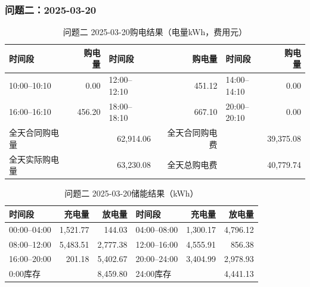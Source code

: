 \par\noindent\begin{minipage}{\textwidth}
\subsubsection*{问题二：2025-03-20}
\begin{table}[H]\centering\small\setlength{\tabcolsep}{4pt}\caption{问题二 2025-03-20购电结果（电量kWh，费用元）}
\begin{tabular}{lr lr lr}\toprule
时间段 & 购电量 & 时间段 & 购电量 & 时间段 & 购电量\\\midrule
10:00--10:10 & 0.00 & 12:00--12:10 & 451.12 & 14:00--14:10 & 0.00\\
16:00--16:10 & 456.20 & 18:00--18:10 & 667.10 & 20:00--20:10 & 0.00\\
\midrule
全天合同购电量 & \multicolumn{2}{r}{62,914.06} & 全天合同购电费 & \multicolumn{2}{r}{39,375.08}\\
全天实际购电量 & \multicolumn{2}{r}{63,230.08} & 全天总购电费 & \multicolumn{2}{r}{40,779.74}\\
\bottomrule\end{tabular}\end{table}
\begin{table}[H]\centering\small\setlength{\tabcolsep}{4pt}\caption{问题二 2025-03-20储能结果（kWh）}
\begin{tabular}{lrr lrr}\toprule
时间段 & 充电量 & 放电量 & 时间段 & 充电量 & 放电量\\\midrule
00:00--04:00 & 1,521.77 & 144.03 & 04:00--08:00 & 1,300.17 & 4,796.12\\
08:00--12:00 & 5,483.51 & 2,777.38 & 12:00--16:00 & 4,555.91 & 856.38\\
16:00--20:00 & 201.18 & 5,402.67 & 20:00--24:00 & 3,404.99 & 2,978.93\\
\midrule
0:00库存 & \multicolumn{2}{r}{8,459.80} & 24:00库存 & \multicolumn{2}{r}{4,441.13}\\
\bottomrule\end{tabular}\end{table}
\end{minipage}\par


